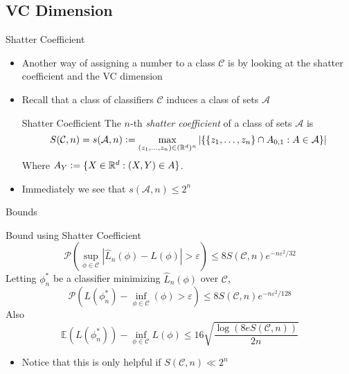 \documentclass{beamer}
\renewcommand{\Pr}[1]{\mathcal{P} \left( #1 \right)}
\newcommand{\cls}{\mathcal{C}}
\newcommand{\E}[1]{\mathbb{E}\left( #1 \right)}
\newcommand{\R}{\mathbb{R}}
\newcommand{\defeq}{\vcentcolon=}
\newcommand{\abs}[1]{\left| #1 \right|}
\newcommand{\br}[1]{\left\{ #1 \right\} }
\newcommand{\eps}{\varepsilon}
\begin{document}
\subsection{VC Dimension}
\begin{frame}{Shatter Coefficient}
\begin{itemize}
\item Another way of assigning a number to a class $\cls$ is by looking at the shatter coefficient and the VC dimension
\item Recall that a class of classifiers $\cls$ induces a class of sets $\mathcal A$
\begin{block}{Shatter Coefficient}
The $n$-th \emph{shatter coefficient} of a class of sets $\mathcal{A}$ is
\[ S(\cls, n) = s(\mathcal A, n) \defeq \max_{(z_1,\ldots,z_n)\in (\R^d)^n} \abs{ \br{ \br{z_1, \ldots, z_n} \cap A_{0,1} : A \in \mathcal A}} \]
Where $A_Y \defeq \{X \in \R^d : (X,Y) \in A\}$.
\end{block}
\item Immediately we see that $s(\mathcal A, n) \leq 2^n$
\end{itemize}
\end{frame}


\begin{frame}{Bounds}
\begin{block}{Bound using Shatter Coefficient}
\[ \Pr{ \sup_{\phi \in \cls} \abs{ \hat{L}_n (\phi) - L(\phi)} > \eps } \leq 8 S(\cls, n) e^{-n\eps^2/32} \]
Letting $\phi_n^*$ be a classifier minimizing $\hat{L}_n(\phi)$ over $\cls$,
\[ \Pr{ L(\phi^*_n) - \inf_{\phi \in \cls} (\phi) > \eps } \leq 8 S(\cls,n)e^{-n\eps^2/128} \]
Also
\[ \E{L(\phi^*_n)} - \inf_{\phi\in\cls} L(\phi) \leq 16 \sqrt{\frac{\log(8eS(\cls, n))}{2n}} \]
\end{block}
\begin{itemize}
\item Notice that this is only helpful if $S(\cls,n) \ll 2^n$
\end{itemize}
\end{frame}
\end{document}
